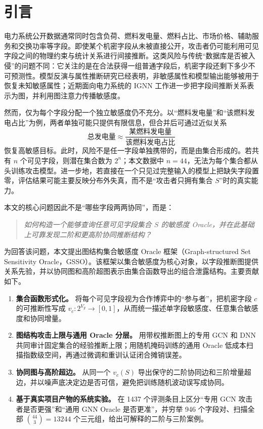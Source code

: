 \documentclass[UTF8,a4paper,zihao=5,fontset=fandol]{ctexart}
\newcommand{\method}{GSSO}
\begin{document}
\pagestyle{fancy}

\section{引言}

电力系统公开数据通常同时包含负荷、燃料发电量、燃料占比、市场价格、辅助服务和交换功率等字段。即使某个机密字段从未被直接公开，攻击者仍可能利用可见字段之间的物理约束与统计关系进行间接推断。这类风险与传统“数据库是否被入侵”的问题不同：它关注的是在合法获得一组普通字段后，机密字段还剩下多少不可预测性。模型反演与属性推断研究已经表明，非敏感属性和模型输出能够被用于恢复未知敏感属性\citep{fredrikson2015model,mehnaz2022sensitive}；近期面向电力系统的 IGNN 工作进一步把字段间推断关系表示为图，并利用图注意力传播敏感度\citep{hu2026ignn}。

然而，仅为每个字段分配一个独立敏感度仍不充分。以“燃料发电量”和“该燃料发电占比”为例，两者单独可能只提供有限信息，但合并后可通过近似关系
\begin{equation}
  \text{总发电量}\approx
  \frac{\text{某燃料发电量}}{\text{该燃料发电占比}}
\end{equation}
恢复高敏感目标。此时，风险不是任一字段单独携带的，而是由集合形成的。若共有 $n$ 个可见字段，则潜在集合数为 $2^n$；本文数据中 $n=44$，无法为每个集合都从头训练攻击模型。进一步地，若直接在一个只见过完整输入的模型上把缺失字段置零，评估结果可能主要反映分布外失真，而不是“攻击者只拥有集合 $S$”时的真实能力。

本文的核心问题因此不是“哪些字段两两协同”，而是：
\begin{quote}
\centering
\emph{如何构造一个能够查询任意可见字段集合 $S$ 的敏感度 Oracle，并在此基础上可靠发现二阶和更高阶协同推断结构？}
\end{quote}

为回答该问题，本文提出图结构集合敏感度 Oracle 框架（Graph-structured Set Sensitivity Oracle，\method）。该框架以集合敏感度为核心对象，以字段推断图提供关系先验，并以协同图和高阶超图表示由集合函数导出的组合泄露结构。主要贡献如下。

\begin{enumerate}
  \item \textbf{集合函数形式化。} 将每个可见字段视为合作博弈中的“参与者”，把机密字段 $c$ 的可推断性写成 $v_c:2^{V_g}\rightarrow[0,1]$，从而统一描述单字段敏感度、任意集合敏感度和协同增量。
  \item \textbf{图结构攻击上限与通用 Oracle 分层。} 用带权推断图上的专用 GCN 和 DNN 共同审计固定集合的经验推断上限；用随机掩码训练的通用 Oracle 低成本扫描指数级空间，再通过微调和重训认证闭合摊销误差。
  \item \textbf{协同图与高阶超边。} 从同一个 $v_c(S)$ 导出保守的二阶协同边和三阶增量超边，并以噪声底决定边是否可信，避免把训练随机波动误写成协同。
  \item \textbf{基于真实项目产物的系统实验。} 在 1437 个评测条目上区分“专用 GCN 攻击者是否更强”和“通用 GNN Oracle 是否更准”，并穷举 946 个字段对、扫描全部 $\binom{44}{3}=13244$ 个三元组，给出可解释的二阶与三阶案例。
\end{enumerate}
\end{document}
